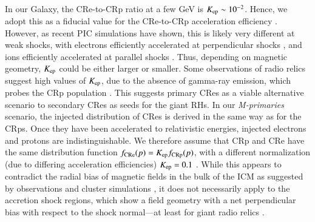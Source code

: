 \documentclass[fleqn,usenatbib,useAMS]{mnras}
\begin{document}
In our Galaxy, the CRe-to-CRp ratio at a few GeV is $K_{{\mathrm{ep}}} \sim
10^{-2}$. Hence, we adopt this as a fiducial value for the CRe-to-CRp
acceleration efficiency \citep[see][for more
  discussion]{pinzke13}. However, as recent PIC simulations have
shown, this is likely very different at weak shocks, with electrons
efficiently accelerated at perpendicular shocks
\citep{2014ApJ...794..153G,2014ApJ...797...47G}, and ions efficiently
accelerated at parallel shocks \citep{2014ApJ...783...91C}. Thus,
depending on magnetic geometry, $K_{{\mathrm{ep}}}$ could be either larger
or smaller. Some observations of radio relics suggest high values of
$K_{{\mathrm{ep}}}$, due to the absence of gamma-ray emission, which probes
the CRp population \citep{2014MNRAS.437.2291V}. This suggests primary
CRes as a viable alternative scenario to secondary CRes as seeds for
the giant RHs. In our {\em M-primaries} scenario, the injected
distribution of CRes is derived in the same way as for the CRps. Once
they have been accelerated to relativistic energies, injected
electrons and protons are indistinguishable. We therefore assume that
CRp and CRe have the same distribution function $f_{\mathrm{CRe}}(p) =
K_{\mathrm{ep}} f_{\mathrm{CRp}}(p)$, with a different normalization (due to
differing acceleration efficiencies) $K_{\mathrm{ep}}=0.1$ \citep[which is
  viable for primarily perpendicular
  shocks][]{2014ApJ...794..153G}. While this appears to contradict the
radial bias of magnetic fields in the bulk of the ICM as suggested by
observations \citep{2010NatPh...6..520P} and cluster simulations
\citep{2011ApJ...740...81R}, it does not necessarily apply to the
accretion shock regions, which show a field geometry with a net
perpendicular bias with respect to the shock normal---at least for
giant radio relics \citep{2010Sci...330..347V}.


\end{document}
